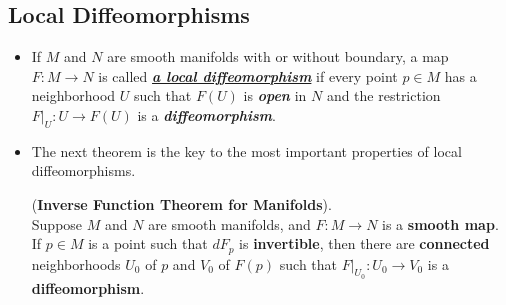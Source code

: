 \documentclass[11pt]{article}
\begin{document}
\subsection{Local Diffeomorphisms}
\begin{itemize}
\item \begin{definition}
If $M$ and $N$ are smooth manifolds with or without boundary, a map $F: M \rightarrow N$ is called \underline{\emph{\textbf{a local diffeomorphism}}} if every point $p \in M$ has a neighborhood $U$ such that $F(U)$ is \emph{\textbf{open}} in $N$ and the restriction $F|_{U}: U \rightarrow F(U)$ is a \emph{\textbf{diffeomorphism}}. 
\end{definition}

\item The next theorem is the key to the most important properties of local diffeomorphisms.
\begin{theorem} (\textbf{Inverse Function Theorem for Manifolds}). \citep{lee2003introduction} \\
Suppose $M$ and $N$ are smooth manifolds, and $F: M \rightarrow N$ is a \textbf{smooth map}. If  $p \in M$ is a point such that $dF_p$ is \textbf{invertible}, then there are \textbf{connected} neighborhoods $U_0$ of $p$ and $V_0$ of $F(p)$ such that $F|_{U_0}: U_0 \rightarrow V_0$ is a \textbf{diffeomorphism}.
\end{theorem}
\end{itemize}
\end{document}
